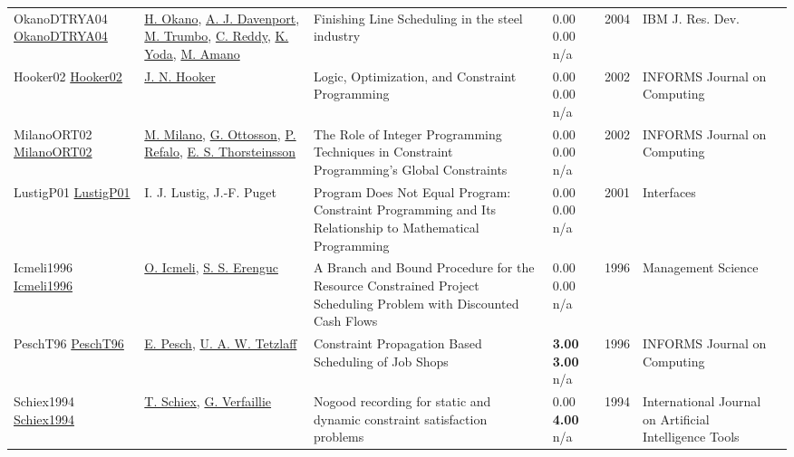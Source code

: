 {\begin{longtable}{p{3cm}p{5cm}p{10cm}p{1cm}rp{2.5cm}l}
OkanoDTRYA04 \href{https://doi.org/10.1147/rd.485.0811}{OkanoDTRYA04} & \hyperref[auth:a1287]{H. Okano}, \hyperref[auth:a248]{A. J. Davenport}, \hyperref[auth:a1288]{M. Trumbo}, \hyperref[auth:a250]{C. Reddy}, \hyperref[auth:a1289]{K. Yoda}, \hyperref[auth:a1290]{M. Amano} & Finishing Line Scheduling in the steel industry & \noindent{}\textcolor{black!50}{0.00} \textcolor{black!50}{0.00} n/a & 2004 & {IBM} J. Res. Dev. & \cite{OkanoDTRYA04}\\
Hooker02 \href{http://dx.doi.org/10.1287/ijoc.14.4.295.2828}{Hooker02} & \hyperref[auth:a160]{J. N. Hooker} & Logic, Optimization, and Constraint Programming & \noindent{}\textcolor{black!50}{0.00} \textcolor{black!50}{0.00} n/a & 2002 & \cellcolor{red!20}INFORMS Journal on Computing & \cite{Hooker02}\\
MilanoORT02 \href{http://dx.doi.org/10.1287/ijoc.14.4.387.2830}{MilanoORT02} & \hyperref[auth:a143]{M. Milano}, \hyperref[auth:a851]{G. Ottosson}, \hyperref[auth:a254]{P. Refalo}, \hyperref[auth:a873]{E. S. Thorsteinsson} & The Role of Integer Programming Techniques in Constraint Programming's Global Constraints & \noindent{}\textcolor{black!50}{0.00} \textcolor{black!50}{0.00} n/a & 2002 & \cellcolor{red!20}INFORMS Journal on Computing & \cite{MilanoORT02}\\
LustigP01 \href{http://dx.doi.org/10.1287/inte.31.6.29.9647}{LustigP01} & I. J. Lustig, J.-F. Puget & Program Does Not Equal Program: Constraint Programming and Its Relationship to Mathematical Programming & \noindent{}\textcolor{black!50}{0.00} \textcolor{black!50}{0.00} n/a & 2001 & \cellcolor{red!20}Interfaces & \cite{LustigP01}\\
Icmeli1996 \href{http://dx.doi.org/10.1287/mnsc.42.10.1395}{Icmeli1996} & \hyperref[auth:a1551]{O. Icmeli}, \hyperref[auth:a1552]{S. S. Erenguc} & A Branch and Bound Procedure for the Resource Constrained Project Scheduling Problem with Discounted Cash Flows & \noindent{}\textcolor{black!50}{0.00} \textcolor{black!50}{0.00} n/a & 1996 & Management Science & \cite{Icmeli1996}\\
PeschT96 \href{http://dx.doi.org/10.1287/ijoc.8.2.144}{PeschT96} & \hyperref[auth:a437]{E. Pesch}, \hyperref[auth:a1215]{U. A. W. Tetzlaff} & Constraint Propagation Based Scheduling of Job Shops & \noindent{}\textbf{3.00} \textbf{3.00} n/a & 1996 & \cellcolor{red!20}INFORMS Journal on Computing & \cite{PeschT96}\\
Schiex1994 \href{http://dx.doi.org/10.1142/s0218213094000108}{Schiex1994} & \hyperref[auth:a1718]{T. Schiex}, \hyperref[auth:a1719]{G. Verfaillie} & Nogood recording for static and dynamic constraint satisfaction problems & \noindent{}\textcolor{black!50}{0.00} \textbf{4.00} n/a & 1994 & International Journal on Artificial Intelligence Tools & \cite{Schiex1994}\\

\end{longtable}}
